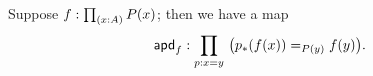 \documentclass[hott-all.tex]{subfiles}
\begin{document}
%

\begin{lem}\label{lem:mapdep}
  Suppose $f:\prd{x: A} P(x)$; then we have a map
  \[\apdfunc f : \prd{p:x=y}\big(\id[P(y)]{\trans p{f(x)}}{f(y)}\big).\]
\end{lem}

%
%
%
\end{document}
